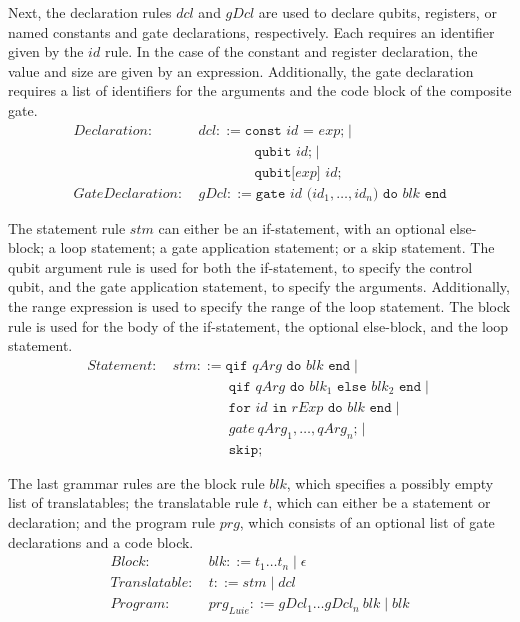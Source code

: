 Next, the declaration rules $dcl$ and $gDcl$ are used to declare qubits, registers, or named constants and gate declarations, respectively. Each requires an identifier given by the $id$ rule. In the case of the constant and register declaration, the value and size are given by an expression. Additionally, the gate declaration requires a list of identifiers for the arguments and the code block of the composite gate.
\begin{align*}
    Declaration: \ & dcl ::= \texttt{const } id \texttt{ = } exp \texttt{;} \mid \\
                 & \quad \quad \quad \quad \texttt{qubit } id \texttt{;} \mid \\
                 & \quad \quad \quad \quad \texttt{qubit[} exp \texttt{] } id \texttt{;}\\
    GateDeclaration: \ & gDcl::= \texttt{gate } id \texttt{ (}id_1, \dots, id_n\texttt{) do } blk \texttt{ end}
\end{align*}

The statement rule $stm$ can either be an if-statement, with an optional else-block; a loop statement; a gate application statement; or a skip statement. The qubit argument rule is used for both the if-statement, to specify the control qubit, and the gate application statement, to specify the arguments. Additionally, the range expression is used to specify the range of the loop statement. The block rule is used for the body of the if-statement, the optional else-block, and the loop statement.
\begin{align*}
    Statement: \ & stm ::= \texttt{qif } qArg \texttt{ do }  blk \texttt{ end} \mid\\
                 & \quad \quad \quad \quad \texttt{qif } qArg \texttt{ do }  blk_1 \texttt{ else } blk_2 \texttt{ end} \mid\\
                 & \quad \quad \quad \quad \texttt{for } id \texttt{ in } rExp \texttt{ do } blk \texttt{ end} \mid \\
                 & \quad \quad \quad \quad gate \ qArg_1, \dots, qArg_n \texttt{;} \mid \\
                 & \quad \quad \quad \quad \texttt{skip;}
\end{align*}

The last grammar rules are the block rule $blk$, which specifies a possibly empty list of translatables; the translatable rule $t$, which can either be a statement or declaration; and the program rule $prg$, which consists of an optional list of gate declarations and a code block.
\begin{align*}
    Block: \ & blk::= t_1 \dots t_n \mid \epsilon\\
    Translatable : \ & t::= stm \mid dcl\\
    Program: \ & prg_{Luie} ::= gDcl_1 \dots gDcl_n \ blk \mid blk 
\end{align*}

